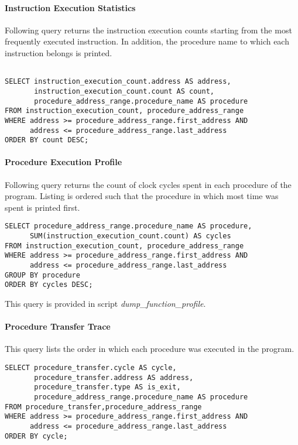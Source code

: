\documentclass[twoside]{tceusermanual}
\begin{document}
\paragraph{Instruction Execution Statistics}

Following query returns the instruction execution counts starting from the
most frequently executed instruction. In addition, the procedure name to which
each instruction belongs is printed.

\begin{verbatim}

SELECT instruction_execution_count.address AS address, 
       instruction_execution_count.count AS count, 
       procedure_address_range.procedure_name AS procedure 
FROM instruction_execution_count, procedure_address_range 
WHERE address >= procedure_address_range.first_address AND 
      address <= procedure_address_range.last_address
ORDER BY count DESC;

\end{verbatim}

\paragraph{Procedure Execution Profile}

Following query returns the count of clock cycles spent in each procedure of
the program. Listing is ordered such that the procedure in which most time was
spent is printed first.

\begin{verbatim}
SELECT procedure_address_range.procedure_name AS procedure, 
      SUM(instruction_execution_count.count) AS cycles 
FROM instruction_execution_count, procedure_address_range 
WHERE address >= procedure_address_range.first_address AND
      address <= procedure_address_range.last_address
GROUP BY procedure
ORDER BY cycles DESC;
\end{verbatim}

This query is provided in script \emph{dump\_function\_profile}.

\paragraph{Procedure Transfer Trace}

This query lists the order in which each procedure was executed in the program.

\begin{verbatim}
SELECT procedure_transfer.cycle AS cycle,
       procedure_transfer.address AS address,
       procedure_transfer.type AS is_exit,
       procedure_address_range.procedure_name AS procedure
FROM procedure_transfer,procedure_address_range
WHERE address >= procedure_address_range.first_address AND
      address <= procedure_address_range.last_address
ORDER BY cycle;
\end{verbatim}
\end{document}
